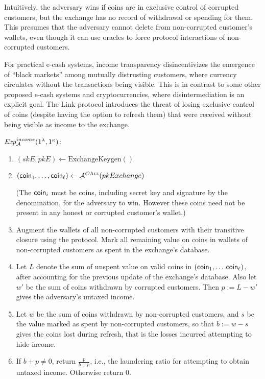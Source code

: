 Intuitively, the adversary wins if coins are in exclusive control of corrupted
customers, but the exchange has no record of withdrawal or spending for them.
This presumes that the adversary cannot delete from non-corrupted customer's
wallets, even though it can use oracles to force protocol interactions of
non-corrupted customers.

For practical e-cash systems, income transparency disincentivizes the emergence
of ``black markets'' among mutually distrusting customers, where currency
circulates without the transactions being visible.  This is in contrast to some
other proposed e-cash systems and cryptocurrencies, where disintermediation is
an explicit goal. The Link protocol introduces the threat of losing exclusive
control of coins (despite having the option to refresh them) that were received
without being visible as income to the exchange.

\begin{mdframed}
\small
\noindent $\mathit{Exp}_{\cal A}^{income}(1^\lambda, 1^\kappa)$:
\vspace{-0.5\topsep}
\begin{enumerate}
  \setlength\itemsep{0em}
  \item $(skE, pkE) \leftarrow \mathrm{ExchangeKeygen}()$
  \item $(\mathsf{coin}_1, \dots, \mathsf{coin}_\ell) \leftarrow \mathcal{A}^{\mathcal{O}\textsc{All}}(pkExchange)$

    (The $\mathsf{coin}_i$ must be coins, including secret key and signature by the
    denomination, for the adversary to win. However these coins need not be
    present in any honest or corrupted customer's wallet.)
  \item\label{game:income:spend} Augment the wallets of all non-corrupted customers with their
    transitive closure using the  protocol.
    Mark all remaining value on coins in wallets of non-corrupted customers as
    spent in the exchange's database.
  \item Let $L$ denote the sum of unspent value on valid coins in $(\mathsf{coin}_1, \dots\, \mathsf{coin}_\ell)$,
    after accounting for the previous update of the exchange's database.
    Also let $w'$ be the sum of coins withdrawn by corrupted customers.
    Then $p := L - w'$ gives the adversary's untaxed income.
  \item Let $w$ be the sum of coins withdrawn by non-corrupted customers, and
    $s$ be the value marked as spent by non-corrupted customers, so that
    $b := w - s$ gives the coins lost during refresh, that is the losses incurred attempting to hide income.
  \item If $b+p \ne 0$, return $\frac{p}{b + p}$, i.e., the laundering ratio for attempting to obtain untaxed income.  Otherwise return $0$.
\end{enumerate}
\end{mdframed}


